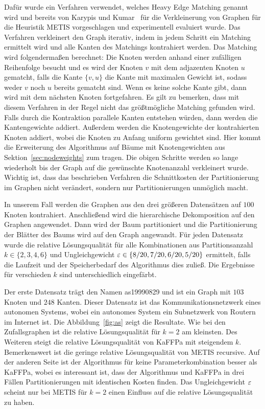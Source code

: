Dafür wurde ein Verfahren verwendet, welches Heavy Edge Matching genannt wird und bereits von Karypis und Kumar~\cite{KK98} für die Verkleinerung von Graphen für die Heuristik METIS vorgeschlagen und experimentell evaluiert wurde.
Das Verfahren verkleinert den Graph iterativ, indem in jedem Schritt ein Matching ermittelt wird und alle Kanten des Matchings kontrahiert werden.
Das Matching wird folgendermaßen berechnet:
Die Knoten werden anhand einer zufälligen Reihenfolge besucht und es wird der Knoten $v$ mit dem adjazenten Knoten $u$ gematcht, falls die Kante $\{v, u\}$ die Kante mit maximalen Gewicht ist, sodass weder $v$ noch $u$ bereits gematcht sind.
Wenn es keine solche Kante gibt, dann wird mit dem nächsten Knoten fortgefahren.
Es gilt zu bemerken, dass mit diesem Verfahren in der Regel nicht das größtmögliche Matching gefunden wird.
Falls durch die Kontraktion parallele Kanten entstehen würden, dann werden die Kantengewichte addiert.
Außerdem werden die Knotengewichte der kontrahierten Knoten addiert, wobei die Knoten zu Anfang uniform gewichtet sind.
Hier kommt die Erweiterung des Algorithmus auf Bäume mit Knotengewichten aus Sektion~\ref{sec:nodeweights} zum tragen.
Die obigen Schritte werden so lange wiederholt bis der Graph auf die gewünschte Knotenanzahl verkleinert wurde.
Wichtig ist, dass das beschrieben Verfahren die Schnittkosten der Partitionierung im Graphen nicht verändert, sondern nur Partitionierungen unmöglich macht.

In unserem Fall werden die Graphen aus den drei größeren Datensätzen auf $100$ Knoten kontrahiert.
Anschließend wird die hierarchische Dekomposition auf den Graphen angewendet.
Dann wird der Baum partitioniert und die Partitionierung der Blätter des Baums wird auf den Graph angewandt.
Für jeden Datensatz wurde die relative Lösungsqualität für alle Kombinationen aus Partitionsanzahl $k \in \{2,3,4,6\}$ und Ungleichgewicht $\varepsilon \in \{8/20, 7/20, 6/20, 5/20\}$ ermittelt, falls die Laufzeit und der Speicherbedarf des Algorithmus dies zuließ.
Die Ergebnisse für verschieden $k$ sind unterschiedlich eingefärbt.

Der erste Datensatz trägt den Namen as19990829 und ist ein Graph mit $103$ Knoten und $248$ Kanten.
Dieser Datensatz ist das Kommunikationsnetzwerk eines autonomen Systems, wobei ein autonomes System ein Subnetzwerk von Routern im Internet ist.
Die Abbildung~\ref{fig:as} zeigt die Resultate.
Wie bei den Zufallsgraphen ist die relative Lösungsqualität für $k=2$ am kleinsten.
Des Weiteren steigt die relative Lösungsqualität von KaFFPa mit steigendem $k$.
Bemerkenswert ist die geringe relative Lösungsqualität von METIS recursive.
Auf der anderen Seite ist der Algorithmus für keine Parameterkombination besser als KaFFPa, wobei es interessant ist, dass der Algorithmus und KaFFPa in drei Fällen Partitionierungen mit identischen Kosten finden.
Das Ungleichgewicht $\varepsilon$ scheint nur bei METIS für $k=2$ einen Einfluss auf die relative Lösungsqualität zu haben.


